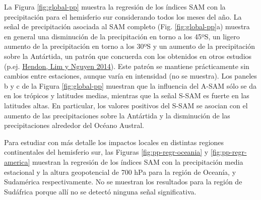 \documentclass[12pt,oneside,a4paper]{reedthesis}
\begin{document}
La Figura \ref{fig:global-pp} muestra la regresión de los índices SAM con la precipitación para el hemisferio sur considerando todos los meses del año.
La señal de precipitación asociada al SAM completo (Fig. \ref{fig:global-pp}a) muestra en general una disminución de la precipitación en torno a los 45ºS, un ligero aumento de la precipitación en torno a los 30ºS y un aumento de la precipitación sobre la Antártida, un patrón que concuerda con los obtenidos en otros estudios (p.ej. \protect\hyperlink{ref-hendon2014}{Hendon, Lim y Nguyen 2014}).
Este patrón se mantiene prácticamente sin cambios entre estaciones, aunque varía en intensidad (no se muestra).
Los paneles b y c de la Figura \ref{fig:global-pp} muestran que la influencia del A-SAM sólo se da en los trópicos y latitudes medias, mientras que la señal S-SAM es fuerte en las latitudes altas.
En particular, los valores positivos del S-SAM se asocian con el aumento de las precipitaciones sobre la Antártida y la disminución de las precipitaciones alrededor del Océano Austral.

Para estudiar con más detalle los impactos locales en distintas regiones continentales del hemisferio sur, las Figuras \ref{fig:pp-regr-oceania} y \ref{fig:pp-regr-america} muestran la regresión de los índices SAM con la precipitación media estacional y la altura geopotencial de 700 hPa para la región de Oceanía, y Sudamérica respectivamente.
No se muestran los resultados para la región de Sudáfrica porque allí no se detectó ninguna señal significativa.
\end{document}
